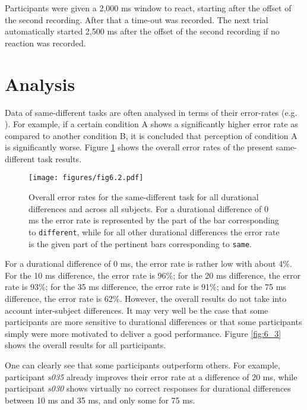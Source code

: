 Participants were given a 2,000 ms window to react, starting after the offset of the second recording. After that a time-out was recorded. The next trial automatically started 2,500 ms after the offset of the second recording if no reaction was recorded.

\section{Analysis}\label{section06_2}

Data of same-different tasks are often analysed in terms of their error-rates (e.g. \cite{Belke2002, Norris2008errorrates, Lupker2018}). For example, if a certain condition A shows a significantly higher error rate as compared to another condition B, it is concluded that perception of condition A is significantly worse. Figure \ref{fig:6_2} shows the overall error rates of the present same-different task results.

\begin{figure}
    \centering
    \texttt{[image: figures/fig6.2.pdf]}
    \caption{Overall error rates for the same-different task for all durational differences and across all subjects. For a durational difference of 0 ms the error rate is represented by the part of the bar corresponding to \texttt{different}, while for all other durational differences the error rate is the given part of the pertinent bars corresponding to \texttt{same}.}
    \label{fig:6_2}
\end{figure}

For a durational difference of 0 ms, the error rate is rather low with about 4\%. For the 10 ms difference, the error rate is 96\%; for the 20 ms difference, the error rate is 93\%; for the 35 ms difference, the error rate is 91\%; and for the 75 ms difference, the error rate is 62\%. However, the overall results do not take into account inter-subject differences. It may very well be the case that some participants are more sensitive to durational differences or that some participants simply were more motivated to deliver a good performance. Figure \ref{fig:6_3} shows the overall results for all participants. 

One can clearly see that some participants outperform others. For example, participant \textit{s035} already improves their error rate at a difference of 20 ms, while participant \textit{s030} shows virtually no correct responses for durational differences between 10 ms and 35 ms, and only some for 75 ms.

